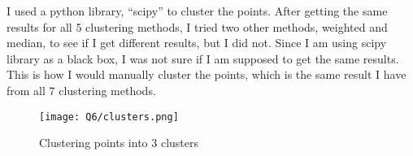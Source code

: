 I used a python library, ``scipy'' to cluster the points. After getting the same results for all 5 clustering methods, I tried two other methods, weighted and median, to see if I get different results, but I did not. Since I am using scipy library as a black box, I was not sure if I am supposed to get the same results. This is how I would manually cluster the points, which is the same result I have from all 7 clustering methods.

\begin{figure}[h]
\caption{Clustering points into 3 clusters}
\centering
\texttt{[image: Q6/clusters.png]}
\end{figure}
